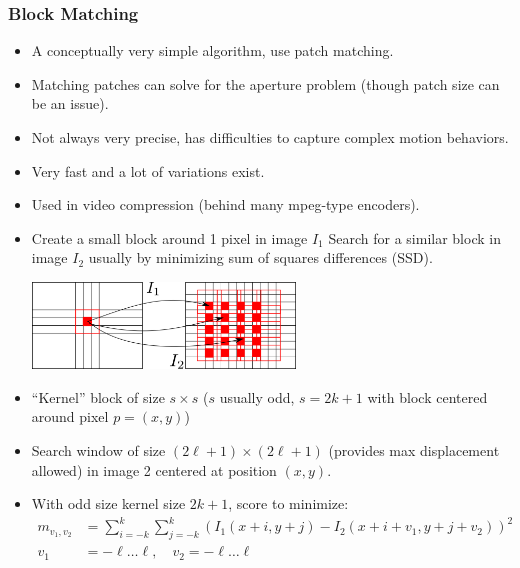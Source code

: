 \documentclass[10pt]{beamer}
\begin{document}
\begin{frame}
  \frametitle{Block Matching }
  \begin{itemize}
  \item A conceptually very simple algorithm, use patch matching.\vfill
  \item Matching patches can solve for the aperture problem (though patch size can be an issue).\vfill
  \item Not always very precise, has difficulties to capture complex motion behaviors.\vfill
  \item Very fast and a lot of variations exist.\vfill
  \item Used in video compression (behind many mpeg-type encoders).
  \end{itemize}
\end{frame}

\begin{frame}
  \begin{itemize}
  \item  Create a small block around 1 pixel in
    image $I_1$ Search for a similar block in image $I_2$ usually by
    minimizing sum of squares differences (SSD).
    \begin{center}
      \includegraphics[width=0.55\textwidth]{FIGURES/blockmatch}
    \end{center}\vfill
  \item ``Kernel'' block of size $s\times s$ ($s$ usually odd, $s = 2k+1$ with block centered around pixel $p = (x,y)$)
  \end{itemize}
\end{frame}  

\begin{frame}
  \begin{itemize}
  \item Search window of size $(2\ell +1)\times(2\ell+1)$ (provides
    max displacement allowed) in image 2 centered at position
    $(x,y)$.\vfill
  \item
    With odd size kernel size $2k+1$,  score to minimize:
    \begin{align*}
      m_{v_1,v_2} &= \sum_{i=-k}^k\sum_{j=-k}^k\left(I_1(x+i,y+j)- I_2(x+i+v_1,y+j+v_2)\right)^2\\
      v_1 &= -\ell\dots\ell,\quad v_2 = -\ell\dots\ell
    \end{align*}
  \end{itemize}
\end{frame}
\end{document}
